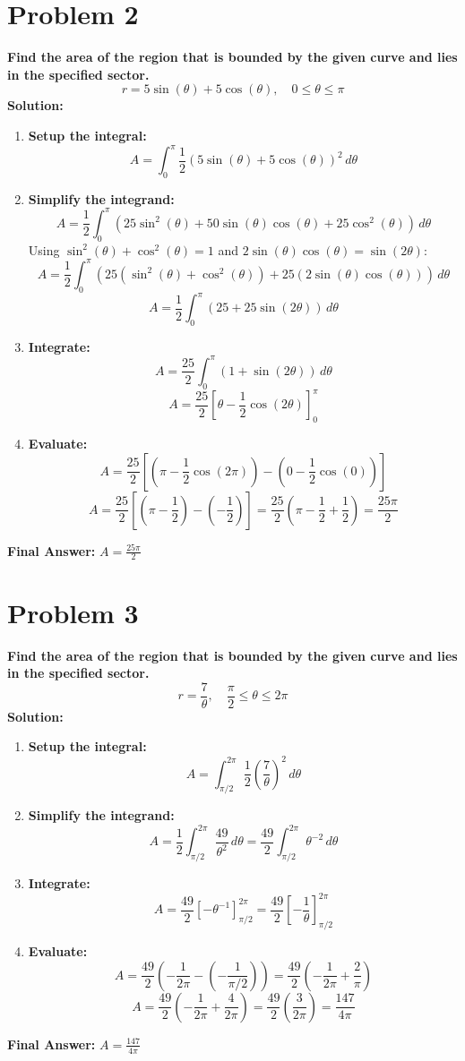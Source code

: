 \documentclass{article}
\begin{document}
\section*{Problem 2}
\textbf{Find the area of the region that is bounded by the given curve and lies in the specified sector.}
\[ r = 5\sin(\theta) + 5\cos(\theta), \quad 0 \le \theta \le \pi \]
\textbf{Solution:}
\begin{enumerate}
    \item \textbf{Setup the integral:}
    \[ A = \int_{0}^{\pi} \frac{1}{2} (5\sin(\theta) + 5\cos(\theta))^2 \,d\theta \]
    \item \textbf{Simplify the integrand:}
    \[ A = \frac{1}{2} \int_{0}^{\pi} (25\sin^2(\theta) + 50\sin(\theta)\cos(\theta) + 25\cos^2(\theta)) \,d\theta \]
    Using $\sin^2(\theta) + \cos^2(\theta) = 1$ and $2\sin(\theta)\cos(\theta) = \sin(2\theta)$:
    \[ A = \frac{1}{2} \int_{0}^{\pi} (25(\sin^2(\theta) + \cos^2(\theta)) + 25(2\sin(\theta)\cos(\theta))) \,d\theta \]
    \[ A = \frac{1}{2} \int_{0}^{\pi} (25 + 25\sin(2\theta)) \,d\theta \]
    \item \textbf{Integrate:}
    \[ A = \frac{25}{2} \int_{0}^{\pi} (1 + \sin(2\theta)) \,d\theta \]
    \[ A = \frac{25}{2} \left[ \theta - \frac{1}{2}\cos(2\theta) \right]_{0}^{\pi} \]
    \item \textbf{Evaluate:}
    \[ A = \frac{25}{2} \left[ \left(\pi - \frac{1}{2}\cos(2\pi)\right) - \left(0 - \frac{1}{2}\cos(0)\right) \right] \]
    \[ A = \frac{25}{2} \left[ \left(\pi - \frac{1}{2}\right) - \left(-\frac{1}{2}\right) \right] = \frac{25}{2} \left(\pi - \frac{1}{2} + \frac{1}{2}\right) = \frac{25\pi}{2} \]
\end{enumerate}
\textbf{Final Answer:} $A = \frac{25\pi}{2}$

\section*{Problem 3}
\textbf{Find the area of the region that is bounded by the given curve and lies in the specified sector.}
\[ r = \frac{7}{\theta}, \quad \frac{\pi}{2} \le \theta \le 2\pi \]
\textbf{Solution:}
\begin{enumerate}
    \item \textbf{Setup the integral:}
    \[ A = \int_{\pi/2}^{2\pi} \frac{1}{2} \left(\frac{7}{\theta}\right)^2 \,d\theta \]
    \item \textbf{Simplify the integrand:}
    \[ A = \frac{1}{2} \int_{\pi/2}^{2\pi} \frac{49}{\theta^2} \,d\theta = \frac{49}{2} \int_{\pi/2}^{2\pi} \theta^{-2} \,d\theta \]
    \item \textbf{Integrate:}
    \[ A = \frac{49}{2} \left[ -\theta^{-1} \right]_{\pi/2}^{2\pi} = \frac{49}{2} \left[ -\frac{1}{\theta} \right]_{\pi/2}^{2\pi} \]
    \item \textbf{Evaluate:}
    \[ A = \frac{49}{2} \left( -\frac{1}{2\pi} - \left(-\frac{1}{\pi/2}\right) \right) = \frac{49}{2} \left( -\frac{1}{2\pi} + \frac{2}{\pi} \right) \]
    \[ A = \frac{49}{2} \left( -\frac{1}{2\pi} + \frac{4}{2\pi} \right) = \frac{49}{2} \left( \frac{3}{2\pi} \right) = \frac{147}{4\pi} \]
\end{enumerate}
\textbf{Final Answer:} $A = \frac{147}{4\pi}$
\end{document}
